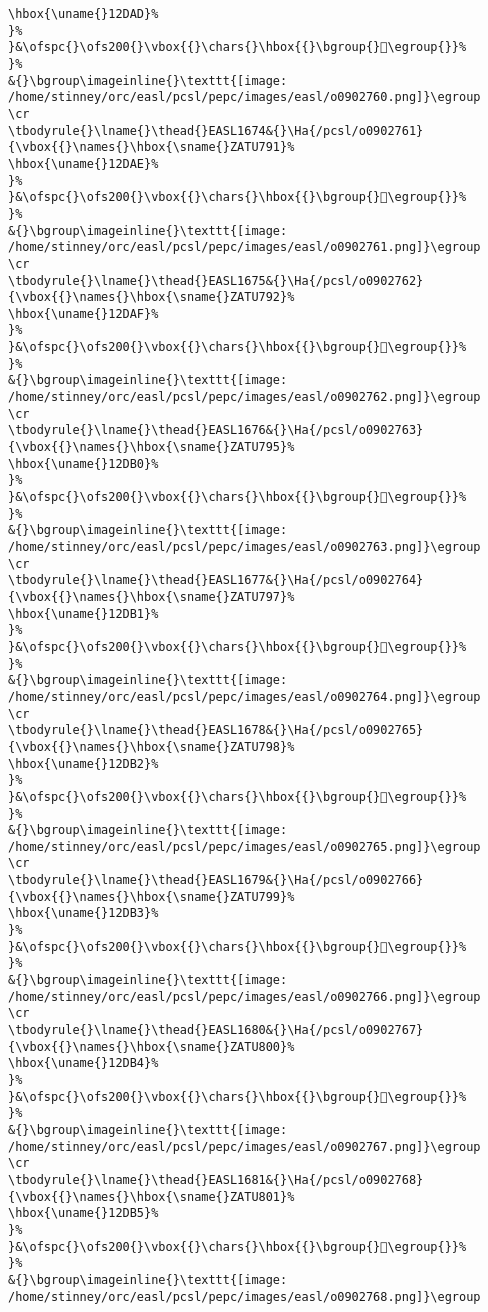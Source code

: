 \begin{verbatim}
\hbox{\uname{}12DAD}%
}%
}&\ofspc{}\ofs200{}\vbox{{}\chars{}\hbox{{}\bgroup{}𒶭\egroup{}}%
}%
&{}\bgroup\imageinline{}\texttt{[image: /home/stinney/orc/easl/pcsl/pepc/images/easl/o0902760.png]}\egroup
\cr
\tbodyrule{}\lname{}\thead{}EASL1674&{}\Ha{/pcsl/o0902761}{\vbox{{}\names{}\hbox{\sname{}ZATU791}%
\hbox{\uname{}12DAE}%
}%
}&\ofspc{}\ofs200{}\vbox{{}\chars{}\hbox{{}\bgroup{}𒶮\egroup{}}%
}%
&{}\bgroup\imageinline{}\texttt{[image: /home/stinney/orc/easl/pcsl/pepc/images/easl/o0902761.png]}\egroup
\cr
\tbodyrule{}\lname{}\thead{}EASL1675&{}\Ha{/pcsl/o0902762}{\vbox{{}\names{}\hbox{\sname{}ZATU792}%
\hbox{\uname{}12DAF}%
}%
}&\ofspc{}\ofs200{}\vbox{{}\chars{}\hbox{{}\bgroup{}𒶯\egroup{}}%
}%
&{}\bgroup\imageinline{}\texttt{[image: /home/stinney/orc/easl/pcsl/pepc/images/easl/o0902762.png]}\egroup
\cr
\tbodyrule{}\lname{}\thead{}EASL1676&{}\Ha{/pcsl/o0902763}{\vbox{{}\names{}\hbox{\sname{}ZATU795}%
\hbox{\uname{}12DB0}%
}%
}&\ofspc{}\ofs200{}\vbox{{}\chars{}\hbox{{}\bgroup{}𒶰\egroup{}}%
}%
&{}\bgroup\imageinline{}\texttt{[image: /home/stinney/orc/easl/pcsl/pepc/images/easl/o0902763.png]}\egroup
\cr
\tbodyrule{}\lname{}\thead{}EASL1677&{}\Ha{/pcsl/o0902764}{\vbox{{}\names{}\hbox{\sname{}ZATU797}%
\hbox{\uname{}12DB1}%
}%
}&\ofspc{}\ofs200{}\vbox{{}\chars{}\hbox{{}\bgroup{}𒶱\egroup{}}%
}%
&{}\bgroup\imageinline{}\texttt{[image: /home/stinney/orc/easl/pcsl/pepc/images/easl/o0902764.png]}\egroup
\cr
\tbodyrule{}\lname{}\thead{}EASL1678&{}\Ha{/pcsl/o0902765}{\vbox{{}\names{}\hbox{\sname{}ZATU798}%
\hbox{\uname{}12DB2}%
}%
}&\ofspc{}\ofs200{}\vbox{{}\chars{}\hbox{{}\bgroup{}𒶲\egroup{}}%
}%
&{}\bgroup\imageinline{}\texttt{[image: /home/stinney/orc/easl/pcsl/pepc/images/easl/o0902765.png]}\egroup
\cr
\tbodyrule{}\lname{}\thead{}EASL1679&{}\Ha{/pcsl/o0902766}{\vbox{{}\names{}\hbox{\sname{}ZATU799}%
\hbox{\uname{}12DB3}%
}%
}&\ofspc{}\ofs200{}\vbox{{}\chars{}\hbox{{}\bgroup{}𒶳\egroup{}}%
}%
&{}\bgroup\imageinline{}\texttt{[image: /home/stinney/orc/easl/pcsl/pepc/images/easl/o0902766.png]}\egroup
\cr
\tbodyrule{}\lname{}\thead{}EASL1680&{}\Ha{/pcsl/o0902767}{\vbox{{}\names{}\hbox{\sname{}ZATU800}%
\hbox{\uname{}12DB4}%
}%
}&\ofspc{}\ofs200{}\vbox{{}\chars{}\hbox{{}\bgroup{}𒶴\egroup{}}%
}%
&{}\bgroup\imageinline{}\texttt{[image: /home/stinney/orc/easl/pcsl/pepc/images/easl/o0902767.png]}\egroup
\cr
\tbodyrule{}\lname{}\thead{}EASL1681&{}\Ha{/pcsl/o0902768}{\vbox{{}\names{}\hbox{\sname{}ZATU801}%
\hbox{\uname{}12DB5}%
}%
}&\ofspc{}\ofs200{}\vbox{{}\chars{}\hbox{{}\bgroup{}𒶵\egroup{}}%
}%
&{}\bgroup\imageinline{}\texttt{[image: /home/stinney/orc/easl/pcsl/pepc/images/easl/o0902768.png]}\egroup

\end{verbatim}
